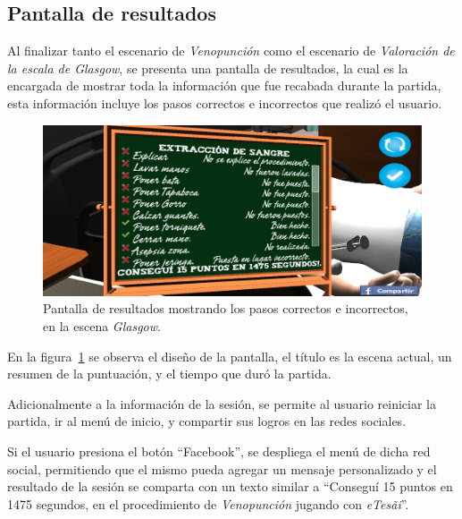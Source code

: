 \subsection{Pantalla de resultados}

Al finalizar tanto el escenario de \emph{Venopunción} como el escenario de \emph{Valoración de 
la escala de Glasgow}, se presenta una pantalla de resultados, la cual es
la encargada de mostrar toda la información que fue recabada durante la partida,
esta información incluye los pasos correctos e incorrectos que realizó el
usuario.

\begin{figure}[H]
\centering
\includegraphics[scale=0.5]{solucion/images/resultado_hemocultivo.jpg}
\caption{Pantalla de resultados mostrando los pasos correctos e incorrectos, en
    la escena \emph{Glasgow}.}
\label{fig:resultados_glasgow}
\end{figure}

En la figura~\ref{fig:resultados_glasgow} se observa el diseño de la
pantalla, el título es la escena actual, un resumen de la
puntuación, y el tiempo que duró la partida.

Adicionalmente a la información de la sesión, se permite al usuario reiniciar la
partida, ir al menú de inicio, y compartir sus logros en las redes sociales.

Si el usuario presiona el botón \enquote{Facebook}, se despliega el menú de
dicha red social, permitiendo que el mismo pueda agregar un mensaje
personalizado y el resultado de la sesión se comparta con un texto similar a
\enquote{Conseguí 15 puntos en 1475 segundos, en el procedimiento de
    \emph{Venopunción} jugando con \textit{eTes\~{a}i}}.

